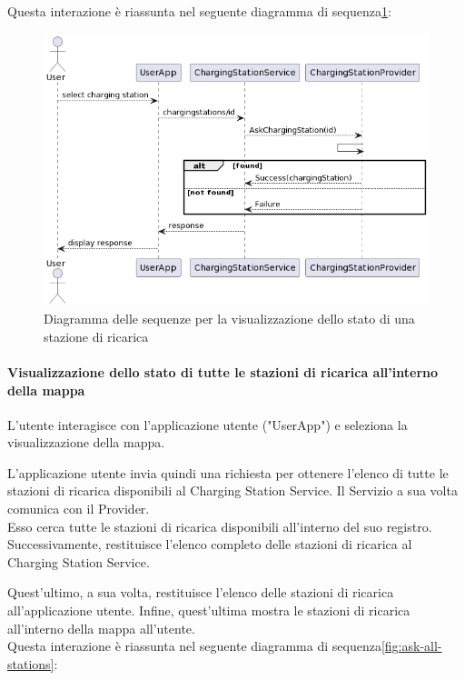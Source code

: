Questa interazione è riassunta nel seguente diagramma di sequenza\ref{fig:ask-station}:

\begin{figure}[htbp]
    \centering
    \includegraphics[width=\textwidth]{images/ask-station.png}
    \caption{Diagramma delle sequenze per la visualizzazione dello stato di una stazione di ricarica}
    \label{fig:ask-station}
\end{figure}

\paragraph{Visualizzazione dello stato di tutte le stazioni di ricarica all'interno della mappa}
L'utente interagisce con l'applicazione utente ("UserApp") e seleziona la visualizzazione della mappa.

L'applicazione utente invia quindi una richiesta per ottenere l'elenco di tutte le stazioni di
ricarica disponibili al Charging Station Service. Il Servizio a sua volta comunica con il Provider.\\

Esso cerca tutte le stazioni di ricarica disponibili all'interno del suo registro. Successivamente,
restituisce l'elenco completo delle stazioni di ricarica al Charging Station Service.

Quest'ultimo, a sua volta, restituisce l'elenco delle stazioni di ricarica all'applicazione
utente. Infine, quest'ultima mostra le stazioni di ricarica all'interno della mappa all'utente.\\

Questa interazione è riassunta nel seguente diagramma di sequenza\ref{fig:ask-all-stations}:

